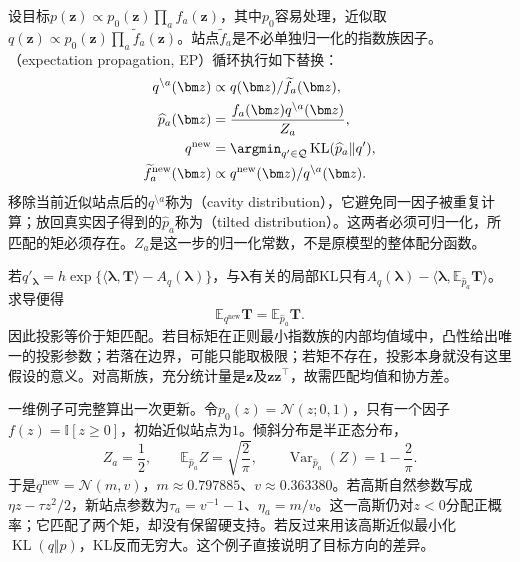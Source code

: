 设目标$p(\bm z)\propto p_0(\bm z)\prod_a f_a(\bm z)$，其中$p_0$容易处理，近似取$q(\bm z)\propto p_0(\bm z)\prod_a\widetilde f_a(\bm z)$。站点$\widetilde f_a$是不必单独归一化的指数族因子。（expectation propagation, EP）循环执行如下替换：
\begin{equation}
  \begin{aligned}
    q^{\setminus a}(\bm z)&\propto q(\bm z)/\widetilde f_a(\bm z),\\
    \widehat p_a(\bm z)&=
       \frac{f_a(\bm z)q^{\setminus a}(\bm z)}{Z_a},\\
    q^{\mathrm{new}}&=
       \argmin_{q'\in\mathcal Q}
           \operatorname{KL}(\widehat p_a\Vert q'),\\
    \widetilde f_a^{\mathrm{new}}(\bm z)&\propto
       q^{\mathrm{new}}(\bm z)/q^{\setminus a}(\bm z).
  \end{aligned}
  \label{eq:pgm-variational-ep}
\end{equation}
移除当前近似站点后的$q^{\setminus a}$称为（cavity distribution），它避免同一因子被重复计算；放回真实因子得到的$\widehat p_a$称为（tilted distribution）。这两者必须可归一化，所匹配的矩必须存在。$Z_a$是这一步的归一化常数，不是原模型的整体配分函数。

若$q'_{\bm{\lambda}}=h\exp\{\langle\bm{\lambda},\bm T\rangle-A_q(\bm{\lambda})\}$，与$\bm{\lambda}$有关的局部KL只有$A_q(\bm{\lambda})-\langle\bm{\lambda},\mathbb E_{\widehat p_a}\bm T\rangle$。求导便得
\begin{equation}
  \mathbb E_{q^{\mathrm{new}}}\bm T
     =\mathbb E_{\widehat p_a}\bm T.
  \label{eq:pgm-variational-moment-matching}
\end{equation}
因此投影等价于矩匹配。若目标矩在正则最小指数族的内部均值域中，凸性给出唯一的投影参数；若落在边界，可能只能取极限；若矩不存在，投影本身就没有这里假设的意义。对高斯族，充分统计量是$\bm z$及$\bm z\bm z^\top$，故需匹配均值和协方差。

一维例子可完整算出一次更新。令$p_0(z)=\mathcal N(z;0,1)$，只有一个因子$f(z)=\mathbb I[z\geq0]$，初始近似站点为$1$。倾斜分布是半正态分布，
\[
  Z_a=\frac12,\qquad
  \mathbb E_{\widehat p_a}Z=\sqrt{\frac2\pi},\qquad
  \operatorname{Var}_{\widehat p_a}(Z)=1-\frac2\pi.
\]
于是$q^{\mathrm{new}}=\mathcal N(m,v)$，$m\approx0.797885$、$v\approx0.363380$。若高斯自然参数写成$\eta z-\tau z^2/2$，新站点参数为$\tau_a=v^{-1}-1$、$\eta_a=m/v$。这一高斯仍对$z<0$分配正概率；它匹配了两个矩，却没有保留硬支持。若反过来用该高斯近似最小化$\operatorname{KL}(q\Vert p)$，KL反而无穷大。这个例子直接说明了目标方向的差异。


